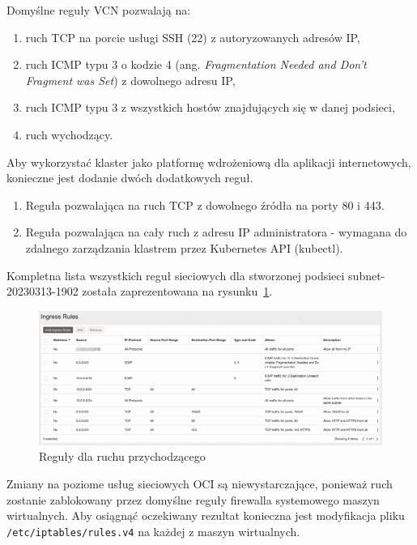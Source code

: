 \noindent Domyślne reguły VCN\cite{oci-security-lists} pozwalają na:
\begin{enumerate}
    \item ruch TCP na porcie usługi SSH (22) z autoryzowanych adresów IP\@,
    \item ruch ICMP typu 3 o kodzie 4 (ang. \emph{Fragmentation Needed and Don't Fragment was Set}) z dowolnego adresu IP,
    \item ruch ICMP typu 3 z wszystkich hostów znajdujących się w danej podsieci,
    \item ruch wychodzący.
\end{enumerate}

\noindent Aby wykorzystać klaster jako platformę wdrożeniową dla aplikacji internetowych, konieczne jest dodanie dwóch dodatkowych reguł.

\begin{enumerate}
    \item Reguła pozwalająca na ruch TCP z dowolnego źródła na porty 80 i 443.
    \item Reguła pozwalająca na cały ruch z adresu IP administratora - wymagana do zdalnego zarządzania klastrem przez Kubernetes API (kubectl).
\end{enumerate}

\noindent Kompletna lista wszystkich reguł sieciowych dla stworzonej podsieci subnet-20230313-1902 została zaprezentowana na rysunku~\ref{fig:oci-subnet-ingress-rules}.

\begin{figure}[H]
    \centering
    \includegraphics[width=\textwidth]{img/oci-subnet-ingress-rules}
    \caption{Reguły dla ruchu przychodzącego}
    \label{fig:oci-subnet-ingress-rules}
\end{figure}

Zmiany na poziome usług sieciowych OCI są niewystarczające, ponieważ ruch zostanie zablokowany przez domyślne reguły firewalla systemowego maszyn wirtualnych.
Aby osiągnąć oczekiwany rezultat konieczna jest modyfikacja pliku \texttt{/etc/iptables/rules.v4} na każdej z maszyn wirtualnych.

